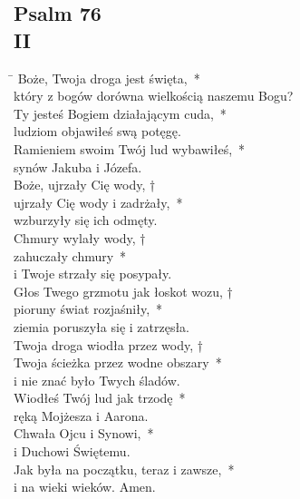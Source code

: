 \subsection*{Psalm 76\\II}
\begin{tabbing}
\hspace{4mm} \= \>\kill
Boże, Twoja droga jest święta,~*\\
który z bogów dorówna wielkością naszemu Bogu?\\
\>Ty jesteś Bogiem działającym cuda,~*\\
\>ludziom objawiłeś swą potęgę.\\
Ramieniem swoim Twój lud wybawiłeś,~*\\
synów Jakuba i Józefa.\\
\>Boże, ujrzały Cię wody, †\\
\>ujrzały Cię wody i zadrżały,~*\\
\>wzburzyły się ich odmęty.\\
Chmury wylały wody, †\\
zahuczały chmury~*\\
i Twoje strzały się posypały.\\
\>Głos Twego grzmotu jak łoskot wozu, †\\
\>pioruny świat rozjaśniły,~*\\
\>ziemia poruszyła się i zatrzęsła.\\
Twoja droga wiodła przez wody, †\\
Twoja ścieżka przez wodne obszary~*\\
i nie znać było Twych śladów.\\
\>Wiodłeś Twój lud jak trzodę~*\\
\>ręką Mojżesza i Aarona.\\
Chwała Ojcu i Synowi,~*\\
i Duchowi Świętemu.\\
\>Jak była na początku, teraz i zawsze,~*\\
\>i na wieki wieków. Amen.
\end{tabbing}

